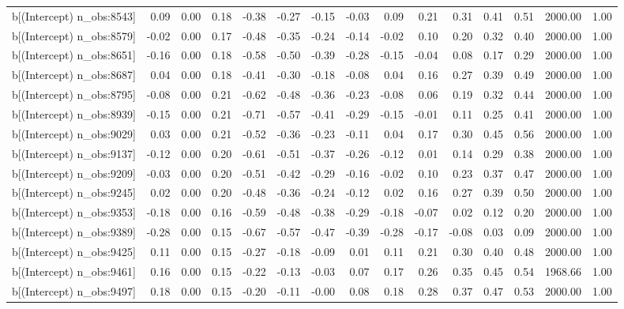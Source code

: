 \begin{table}[ht]
\begin{tabular}{rrrrrrrrrrrrrrr}
  b[(Intercept) n\_obs:8543] & 0.09 & 0.00 & 0.18 & -0.38 & -0.27 & -0.15 & -0.03 & 0.09 & 0.21 & 0.31 & 0.41 & 0.51 & 2000.00 & 1.00 \\ 
  b[(Intercept) n\_obs:8579] & -0.02 & 0.00 & 0.17 & -0.48 & -0.35 & -0.24 & -0.14 & -0.02 & 0.10 & 0.20 & 0.32 & 0.40 & 2000.00 & 1.00 \\ 
  b[(Intercept) n\_obs:8651] & -0.16 & 0.00 & 0.18 & -0.58 & -0.50 & -0.39 & -0.28 & -0.15 & -0.04 & 0.08 & 0.17 & 0.29 & 2000.00 & 1.00 \\ 
  b[(Intercept) n\_obs:8687] & 0.04 & 0.00 & 0.18 & -0.41 & -0.30 & -0.18 & -0.08 & 0.04 & 0.16 & 0.27 & 0.39 & 0.49 & 2000.00 & 1.00 \\ 
  b[(Intercept) n\_obs:8795] & -0.08 & 0.00 & 0.21 & -0.62 & -0.48 & -0.36 & -0.23 & -0.08 & 0.06 & 0.19 & 0.32 & 0.44 & 2000.00 & 1.00 \\ 
  b[(Intercept) n\_obs:8939] & -0.15 & 0.00 & 0.21 & -0.71 & -0.57 & -0.41 & -0.29 & -0.15 & -0.01 & 0.11 & 0.25 & 0.41 & 2000.00 & 1.00 \\ 
  b[(Intercept) n\_obs:9029] & 0.03 & 0.00 & 0.21 & -0.52 & -0.36 & -0.23 & -0.11 & 0.04 & 0.17 & 0.30 & 0.45 & 0.56 & 2000.00 & 1.00 \\ 
  b[(Intercept) n\_obs:9137] & -0.12 & 0.00 & 0.20 & -0.61 & -0.51 & -0.37 & -0.26 & -0.12 & 0.01 & 0.14 & 0.29 & 0.38 & 2000.00 & 1.00 \\ 
  b[(Intercept) n\_obs:9209] & -0.03 & 0.00 & 0.20 & -0.51 & -0.42 & -0.29 & -0.16 & -0.02 & 0.10 & 0.23 & 0.37 & 0.47 & 2000.00 & 1.00 \\ 
  b[(Intercept) n\_obs:9245] & 0.02 & 0.00 & 0.20 & -0.48 & -0.36 & -0.24 & -0.12 & 0.02 & 0.16 & 0.27 & 0.39 & 0.50 & 2000.00 & 1.00 \\ 
  b[(Intercept) n\_obs:9353] & -0.18 & 0.00 & 0.16 & -0.59 & -0.48 & -0.38 & -0.29 & -0.18 & -0.07 & 0.02 & 0.12 & 0.20 & 2000.00 & 1.00 \\ 
  b[(Intercept) n\_obs:9389] & -0.28 & 0.00 & 0.15 & -0.67 & -0.57 & -0.47 & -0.39 & -0.28 & -0.17 & -0.08 & 0.03 & 0.09 & 2000.00 & 1.00 \\ 
  b[(Intercept) n\_obs:9425] & 0.11 & 0.00 & 0.15 & -0.27 & -0.18 & -0.09 & 0.01 & 0.11 & 0.21 & 0.30 & 0.40 & 0.48 & 2000.00 & 1.00 \\ 
  b[(Intercept) n\_obs:9461] & 0.16 & 0.00 & 0.15 & -0.22 & -0.13 & -0.03 & 0.07 & 0.17 & 0.26 & 0.35 & 0.45 & 0.54 & 1968.66 & 1.00 \\ 
  b[(Intercept) n\_obs:9497] & 0.18 & 0.00 & 0.15 & -0.20 & -0.11 & -0.00 & 0.08 & 0.18 & 0.28 & 0.37 & 0.47 & 0.53 & 2000.00 & 1.00 \\ 

\end{tabular}
\end{table}
